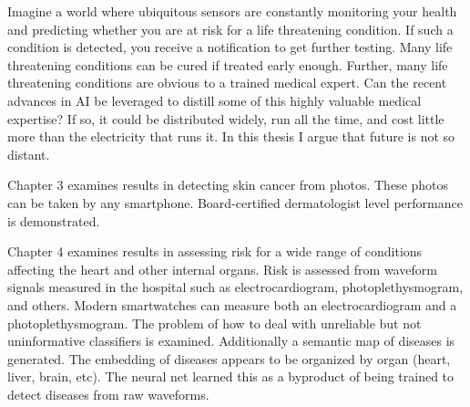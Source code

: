 Imagine a world where ubiquitous sensors are constantly monitoring your health and predicting whether you are at risk for a life threatening condition.  If such a condition is detected, you receive a notification to get further testing.  Many life threatening conditions can be cured if treated early enough.  Further, many life threatening conditions are obvious to a trained medical expert.  Can the recent advances in AI be leveraged to distill some of this highly valuable medical expertise?  If so, it could be distributed widely, run all the time, and cost little more than the electricity that runs it.  In this thesis I argue that future is not so distant. 

Chapter 3 examines results in detecting skin cancer from photos.  These photos can be taken by any smartphone.  Board-certified dermatologist level performance is demonstrated.

Chapter 4 examines results in assessing risk for a wide range of conditions affecting the heart and other internal organs.  Risk is assessed from waveform signals measured in the hospital such as electrocardiogram, photoplethysmogram, and others.  Modern smartwatches can measure both an electrocardiogram and a photoplethysmogram.  The problem of how to deal with unreliable but not uninformative classifiers is examined.  Additionally a semantic map of diseases is generated.  The embedding of diseases appears to be organized by organ (heart, liver, brain, etc).  The neural net learned this as a byproduct of being trained to detect diseases from raw waveforms.